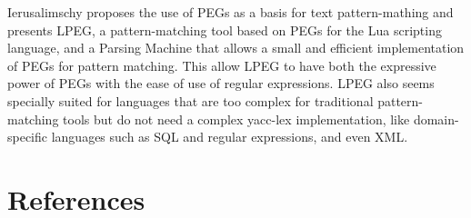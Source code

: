 \documentclass[10pt,sigplan,screen,review,anonymous]{acmart}
\begin{document}
Ierusalimschy \cite{ierusalimschy2009-lpeg} proposes the use of PEGs as a basis
for text pattern-mathing and presents LPEG, a pattern-matching tool based on 
PEGs for the Lua scripting language, and a Parsing Machine that allows a small 
and efficient implementation of PEGs for pattern matching. 
This allow LPEG to have both the expressive power of PEGs with the ease of use 
of regular expressions.
LPEG also seems specially suited for languages that are too complex for 
traditional pattern-matching tools but do not need a complex yacc-lex 
implementation, like domain-specific languages such as SQL and regular
expressions, and even XML.

\section{References}


\end{document}
